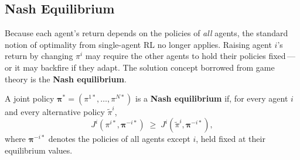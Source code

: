




\subsection{Nash Equilibrium}

Because each agent's return depends on the policies of \emph{all}
agents, the standard notion of optimality from single-agent RL no
longer applies. Raising agent $i$'s return by changing $\pi^i$ may
require the other agents to hold their policies fixed\,---\,or it may
backfire if they adapt. The solution concept borrowed from game theory
is the \textbf{Nash equilibrium}.

\begin{definition}
\label{def:nash}
A joint policy $\boldsymbol{\pi}^* = (\pi^{1*}, \ldots, \pi^{N*})$
is a \textbf{Nash equilibrium} if, for every agent $i$ and every
alternative policy $\tilde\pi^i$,
\[
  J^i(\pi^{i*}, \boldsymbol{\pi}^{-i*}) \;\geq\;
  J^i(\tilde\pi^i, \boldsymbol{\pi}^{-i*}),
\]
where $\boldsymbol{\pi}^{-i*}$ denotes the policies of all agents
except $i$, held fixed at their equilibrium values.
\end{definition}

